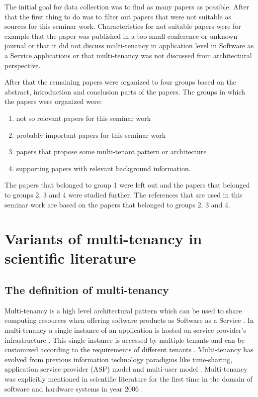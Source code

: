 \documentclass[conference]{sasmoota2017}
\begin{document}
The initial goal for data collection was to find as many papers as possible. After that the first thing to do was to filter out papers that were not suitable as sources for this seminar work. Characteristics for not suitable papers were for example that the paper was published in a too small conference or unknown journal or that it did not discuss multi-tenancy in application level in Software as a Service applications or that multi-tenancy was not discussed from architectural perspective. 

After that the remaining papers were organized to four groups based on the abstract, introduction and conclusion parts of the papers. The groups in which the papers were organized were: 
\begin{enumerate}
\item not so relevant papers for this seminar work
\item probably important papers for this seminar work
\item papers that propose some multi-tenant pattern or architecture
\item supporting papers with relevant background information.
\end{enumerate}
The papers that belonged to group 1 were left out and the papers that belonged to groups 2, 3 and 4 were studied further. The references that are used in this seminar work are based on the papers that belonged to groups 2, 3 and 4. 


\section{Variants of multi-tenancy in scientific literature}

\subsection{The definition of multi-tenancy}


Multi-tenancy is a high level architectural pattern which can be used to share computing resources when offering software products as Software as a Service \cite{Kabbedijk2015:Defining}. In multi-tenancy a single instance of an application is hosted on service provider’s infrastructure \cite{Kabbedijk2015:Defining}. This single instance is accessed by multiple tenants and can be customized according to the requirements of different tenants \cite{Kabbedijk2015:Defining}. Multi-tenancy has evolved from previous information technology paradigms like time-sharing, application service provider (ASP) model and multi-user model \cite{Kabbedijk2015:Defining}. Multi-tenancy was explicitly mentioned in scientific literature for the first time in the domain of software and hardware systems in year 2006 \cite{Kabbedijk2015:Defining}. 
\end{document}
